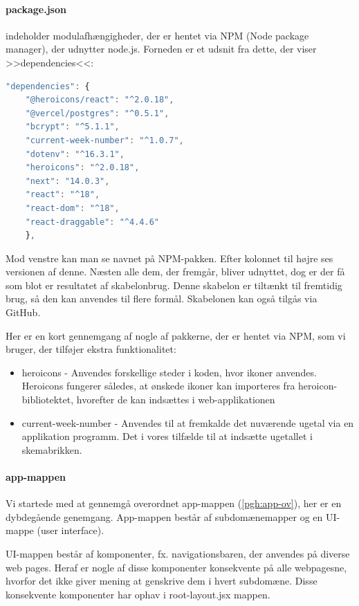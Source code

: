         \paragraph{package.json} indeholder modulafhængigheder, der er hentet via NPM (Node package manager), der udnytter node.js. Forneden er et udsnit fra dette, der viser >>dependencies<<:
        \begin{lstlisting}[language=Javascript]
"dependencies": {
    "@heroicons/react": "^2.0.18",
    "@vercel/postgres": "^0.5.1",
    "bcrypt": "^5.1.1",
    "current-week-number": "^1.0.7",
    "dotenv": "^16.3.1",
    "heroicons": "^2.0.18",
    "next": "14.0.3",
    "react": "^18",
    "react-dom": "^18",
    "react-draggable": "^4.4.6"
    }, 
        \end{lstlisting}

        Mod venstre kan man se navnet på NPM-pakken. Efter kolonnet til højre ses versionen af denne. Næsten alle dem, der fremgår, bliver udnyttet, dog er der få som blot er resultatet af skabelonbrug. Denne skabelon er tiltænkt til fremtidig brug, så den kan anvendes til flere formål. Skabelonen kan også tilgås via GitHub.

        Her er en kort gennemgang af nogle af pakkerne, der er hentet via NPM, som vi bruger, der tilføjer ekstra funktionalitet:
        \begin{itemize}
        \item heroicons - Anvendes forskellige steder i koden, hvor ikoner anvendes. Heroicons fungerer således, at ønskede ikoner kan importeres fra heroicon-bibliotektet, hvorefter de kan indsættes i web-applikationen
        \item current-week-number - Anvendes til at fremkalde det nuværende ugetal via en applikation programm. Det i vores tilfælde til at indsætte ugetallet i skemabrikken. 
        \end{itemize}

        \paragraph{app-mappen}
            Vi startede med at gennemgå overordnet app-mappen (\ref{pgh:app-ov}), her er en dybdegående genemgang. App-mappen består af subdomænemapper og en UI-mappe (user interface).
            
            UI-mappen består af komponenter, fx. navigationsbaren, der anvendes på diverse web pages. Heraf er nogle af disse komponenter konsekvente på alle webpagesne, hvorfor det ikke giver mening at genskrive dem i hvert subdomæne. Disse konsekvente komponenter har ophav i root-layout.jsx mappen.
        
